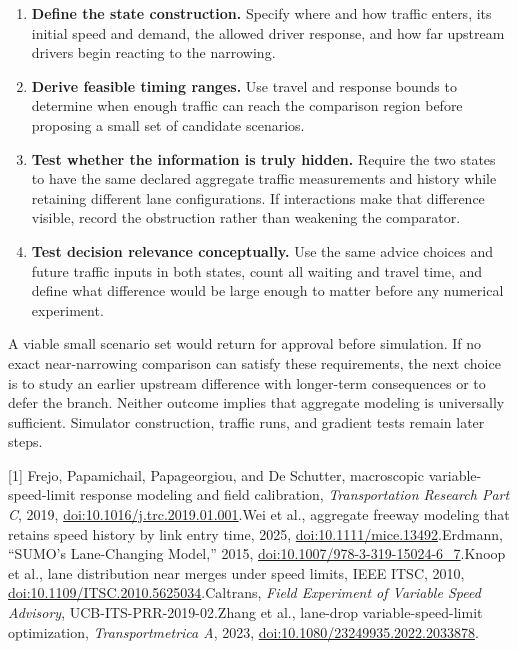 \documentclass[10pt]{article}
\makeatletter
\renewcommand{\section}{\@startsection{section}{1}{0pt}{5pt}{2pt}{\large\bfseries\color{teal}}}
\makeatother
\begin{document}
\begin{enumerate}
  \item \textbf{Define the state construction.} Specify where and how traffic enters, its initial speed and demand, the allowed driver response, and how far upstream drivers begin reacting to the narrowing.
  \item \textbf{Derive feasible timing ranges.} Use travel and response bounds to determine when enough traffic can reach the comparison region before proposing a small set of candidate scenarios.
  \item \textbf{Test whether the information is truly hidden.} Require the two states to have the same declared aggregate traffic measurements and history while retaining different lane configurations. If interactions make that difference visible, record the obstruction rather than weakening the comparator.
  \item \textbf{Test decision relevance conceptually.} Use the same advice choices and future traffic inputs in both states, count all waiting and travel time, and define what difference would be large enough to matter before any numerical experiment.
\end{enumerate}

A viable small scenario set would return for approval before simulation. If no exact near-narrowing comparison can satisfy these requirements, the next choice is to study an earlier upstream difference with longer-term consequences or to defer the branch. Neither outcome implies that aggregate modeling is universally sufficient. Simulator construction, traffic runs, and gradient tests remain later steps.

\section{Selected evidence anchors}

{\footnotesize
[1] Frejo, Papamichail, Papageorgiou, and De Schutter, macroscopic variable-speed-limit response modeling and field calibration, \emph{Transportation Research Part C}, 2019, \href{https://doi.org/10.1016/j.trc.2019.01.001}{doi:10.1016/j.trc.2019.01.001}.\quad
[2] Wei et al., aggregate freeway modeling that retains speed history by link entry time, 2025, \href{https://doi.org/10.1111/mice.13492}{doi:10.1111/mice.13492}.\quad
[3] Erdmann, ``SUMO's Lane-Changing Model,'' 2015, \href{https://doi.org/10.1007/978-3-319-15024-6_7}{doi:10.1007/978-3-319-15024-6\_7}.\quad
[4] Knoop et al., lane distribution near merges under speed limits, IEEE ITSC, 2010, \href{https://doi.org/10.1109/ITSC.2010.5625034}{doi:10.1109/ITSC.2010.5625034}.\quad
[5] Caltrans, \emph{Field Experiment of Variable Speed Advisory}, UCB-ITS-PRR-2019-02.\quad
[6] Zhang et al., lane-drop variable-speed-limit optimization, \emph{Transportmetrica A}, 2023, \href{https://doi.org/10.1080/23249935.2022.2033878}{doi:10.1080/23249935.2022.2033878}.
}
\end{document}
